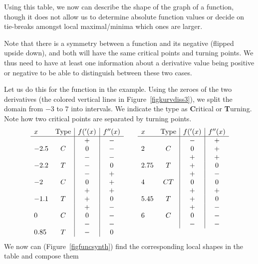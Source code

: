 Using this table, we now can describe the shape of the graph of a function,
though it does not allow us to determine absolute function values or
decide on tie-breaks amongst local maximal/minima which ones are larger.

Note that there is a symmetry between a function and its negative (flipped
upside down), and both will have the same critical points and turning
points. We thus need to have at least one information about a
derivative value being positive or negative to be able to distinguish
between these two cases.
\smallskip

Let us do this for the function in the example. Using the zeroes of the two
derivatives (the colored vertical lines in Figure~\ref{figkurvdiss3}), we
split the domain from $-3$ to $7$ into intervals. We indicate the type as
\textbf{C}ritical or \textbf{T}urning. Note how two critical points are
separated by turning points.
\[
\begin{array}{lc|c|c}
x&\mbox{Type}&f('(x)&f^{\prime\prime}(x)\\
\hline
&&+&-\\
-2.5&C&0&-\\
&&-&-\\
-2.2&T&-&0\\
&&-&+\\
-2&C&0&+\\
&&+&+\\
-1.1&T&+&0\\
&&+&-\\
0&C&0&-\\
&&-&-\\
0.85&T&-&0\\
\end{array}\qquad
\begin{array}{lc|c|c}
x&\mbox{Type}&f('(x)&f^{\prime\prime}(x)\\
\hline
&&-&+\\
2&C&0&+\\
&&+&+\\
2.75&T&+&0\\
&&+&-\\
4&CT&0&0\\
&&+&+\\
5.45&T&+&0\\
&&+&-\\
6&C&0&-\\
&&-&-\\
\\
\end{array}
\]
We now can (Figure~\ref{figfuncsynth}) find the corresponding local shapes in the table and compose them
